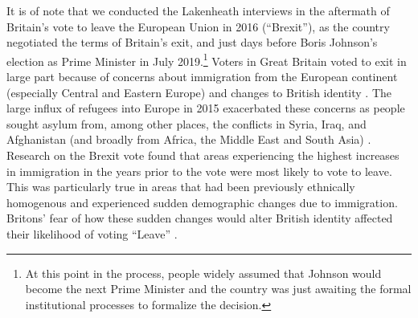 

It is of note that we conducted the Lakenheath interviews in the aftermath of Britain's vote to leave the European Union in 2016 (``Brexit''), as the country negotiated the terms of Britain's exit, and just days before Boris Johnson's election as Prime Minister in July 2019.\footnote{At this point in the process, people widely assumed that Johnson would become the next Prime Minister and the country was just awaiting the formal institutional processes to formalize the decision.} Voters in Great Britain voted to exit in large part because of concerns about immigration from the European continent (especially Central and Eastern Europe) and changes to British identity \cite{Goodwin2016,Goodwin2017}. The large influx of refugees into Europe in 2015 exacerbated these concerns as people sought asylum from, among other places, the conflicts in Syria, Iraq, and Afghanistan (and broadly from Africa, the Middle East and South Asia) \cite{Chan2015}. Research on the Brexit vote found that areas experiencing the highest increases in immigration in the years prior to the vote were most likely to vote to leave. This was particularly true in areas that had been previously ethnically homogenous and experienced sudden demographic changes due to immigration. Britons' fear of how these sudden changes would alter British identity affected their likelihood of voting ``Leave'' \cite{Goodwin2017}.

